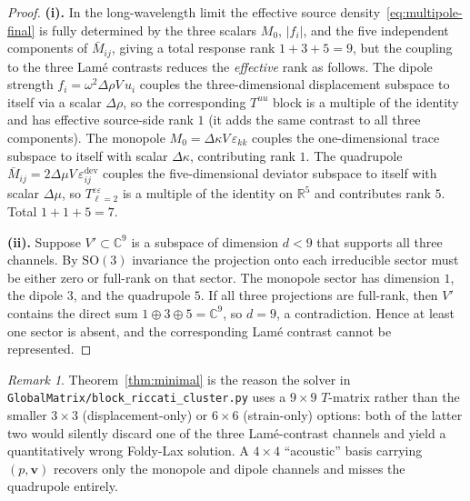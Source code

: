 \documentclass[11pt,a4paper]{article}
\newcommand{\eps}{\varepsilon}
\newcommand{\dev}{\mathrm{dev}}
\theoremstyle{plain}
\theoremstyle{definition}
\theoremstyle{remark}
\newtheorem{remark}[proposition]{Remark}
\begin{document}
\begin{proof}
\textbf{(i).}  In the long-wavelength limit the effective source
density~\eqref{eq:multipole-final} is fully determined by the three
scalars $M_0$, $|f_i|$, and the five independent components of
$\bar{M}_{ij}$, giving a total response rank $1+3+5 = 9$, but the
coupling to the three Lam\'e contrasts reduces the \emph{effective}
rank as follows.  The dipole strength
$f_i=\omega^2\Delta\rho V\, u_i$ couples the three-dimensional
displacement subspace to itself via a scalar $\Delta\rho$, so the
corresponding $T^{uu}$ block is a multiple of the identity and has
effective source-side rank $1$ (it adds the same contrast to all three
components).  The monopole $M_0=\Delta\kappa V\,\eps_{kk}$ couples the
one-dimensional trace subspace to itself with scalar $\Delta\kappa$,
contributing rank $1$.  The quadrupole
$\bar{M}_{ij}=2\Delta\mu V\,\eps_{ij}^{\dev}$ couples the
five-dimensional deviator subspace to itself with scalar
$\Delta\mu$, so $T^{\eps\eps}_{\ell=2}$ is a multiple of the identity
on $\mathbb{R}^5$ and contributes rank $5$.  Total
$1+1+5=7$.

\textbf{(ii).}  Suppose $V'\subset\mathbb{C}^9$ is a subspace of
dimension $d<9$ that supports all three channels.  By
$\mathrm{SO}(3)$ invariance the projection onto each irreducible
sector must be either zero or full-rank on that sector.  The monopole
sector has dimension $1$, the dipole $3$, and the quadrupole $5$.  If
all three projections are full-rank, then $V'$ contains the direct
sum $1\oplus 3\oplus 5 = \mathbb{C}^9$, so $d=9$, a contradiction.
Hence at least one sector is absent, and the corresponding Lam\'e
contrast cannot be represented.
\end{proof}

\begin{remark}
Theorem~\ref{thm:minimal} is the reason the solver in
\texttt{GlobalMatrix/block\_riccati\_cluster.py} uses a $9\times 9$
$T$-matrix rather than the smaller $3\times 3$ (displacement-only)
or $6\times 6$ (strain-only) options: both of the latter two would
silently discard one of the three Lam\'e-contrast channels and yield a
quantitatively wrong Foldy-Lax solution.  A $4\times 4$ ``acoustic''
basis carrying $(p,\bm{v})$ recovers only the monopole and dipole
channels and misses the quadrupole entirely.
\end{remark}

\end{document}
